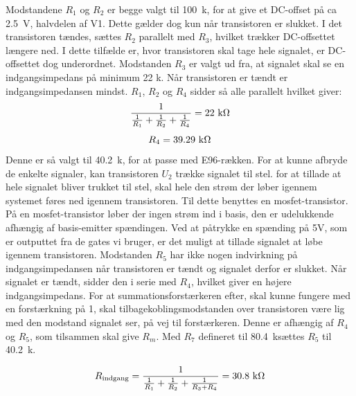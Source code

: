 Modstandene $R_1$ og $R_2$ er begge valgt til 100~k\ohm, for at give et DC-offset på ca 2.5~V, halvdelen af V1. Dette gælder dog kun når transistoren er slukket. I det transistoren tændes, sættes $R_2$ parallelt med $R_3$, hvilket trækker DC-offsettet længere ned.
I dette tilfælde er, hvor transistoren skal tage hele signalet, er DC-offsettet dog underordnet. 
Modstanden $R_3$ er valgt ud fra, at signalet skal se en indgangsimpedans på minimum 22 k\ohm. Når transistoren er tændt er indgangsimpedansen mindst. $R_1$, $R_2$ og $R_4$ sidder så alle parallelt hvilket giver:
\begin{equation}
\frac{1}{\frac{1}{R_1}+\frac{1}{R_2}+\frac{1}{R_4}}=22~\mathrm{k}\ohm
\end{equation}
\begin{equation}
R_4=39.29~\mathrm{k}\ohm
\end{equation}
Denne er så valgt til 40.2~k\ohm, for at passe med E96-rækken.
For at kunne afbryde de enkelte signaler, kan transistoren $U_2$ trække signalet til stel. for at tillade at hele signalet bliver trukket til stel, skal hele den strøm der løber igennem systemet føres ned igennem transistoren. Til dette benyttes en mosfet-transistor. På en mosfet-transistor løber der ingen strøm ind i basis, den er udelukkende afhængig af basis-emitter spændingen. Ved at påtrykke en spænding på 5V, som er outputtet fra de gates vi bruger, er det muligt at tillade signalet at løbe igennem transistoren.
Modstanden $R_5$ har ikke nogen indvirkning på indgangsimpedansen når transistoren er tændt og signalet derfor er slukket. Når signalet er tændt, sidder den i serie med $R_4$, hvilket giver en højere indgangsimpedans. For at summationsforstærkeren efter, skal kunne fungere med en forstærkning på 1, skal tilbagekoblingsmodstanden over transistoren være lig med den modstand signalet ser, på vej til forstærkeren. Denne er afhængig af $R_4$ og $R_5$, som tilsammen skal give $R_m$. Med $R_7$ defineret til 80.4~k\ohm sættes $R_5$ til 40.2~k\ohm .

\begin{equation}
R_{\mathrm{indgang}}=\frac{1}{\frac{1}{R_1}+\frac{1}{R_2}+\frac{1}{R_3+R_4}}=30.8~\mathrm{k}\ohm
\end{equation}

